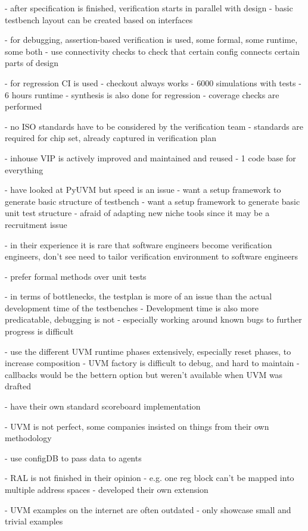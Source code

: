\documentclass[12pt]{book}
\begin{document}
- after specification is finished, verification starts in parallel with design
- basic testbench layout can be created based on interfaces

- for debugging, assertion-based verification is used, some formal, some runtime, some both
- use connectivity checks to check that certain config connects certain parts of design

- for regression CI is used
- checkout always works
- 6000 simulations with tests
- 6 hours runtime
- synthesis is also done for regression
- coverage checks are performed

- no ISO standards have to be considered by the verification team
- standards are required for chip set, already captured in verification plan

- inhouse VIP is actively improved and maintained and reused
- 1 code base for everything

- have looked at PyUVM but speed is an issue
- want a setup framework to generate basic structure of testbench
- want a setup framework to generate basic unit test structure
- afraid of adapting new niche tools since it may be a recruitment issue

- in their experience it is rare that software engineers become verification engineers, don't see need to tailor verification environment to software engineers

- prefer formal methods over unit tests

- in terms of bottlenecks, the testplan is more of an issue than the actual development time of the testbenches
- Development time is also more predicatable, debugging is not
- especially working around known bugs to further progress is difficult

- use the different UVM runtime phases extensively, especially reset phases, to increase composition
- UVM factory is difficult to debug, and hard to maintain
- callbacks would be the bettern option but weren't available when UVM was drafted

- have their own standard scoreboard implementation

- UVM is not perfect, some companies insisted on things from their own methodology

- use configDB to pass data to agents

- RAL is not finished in their opinion
- e.g. one reg block can't be mapped into multiple address spaces
- developed their own extension

- UVM examples on the internet are often outdated
- only showcase small and trivial examples
\end{document}
